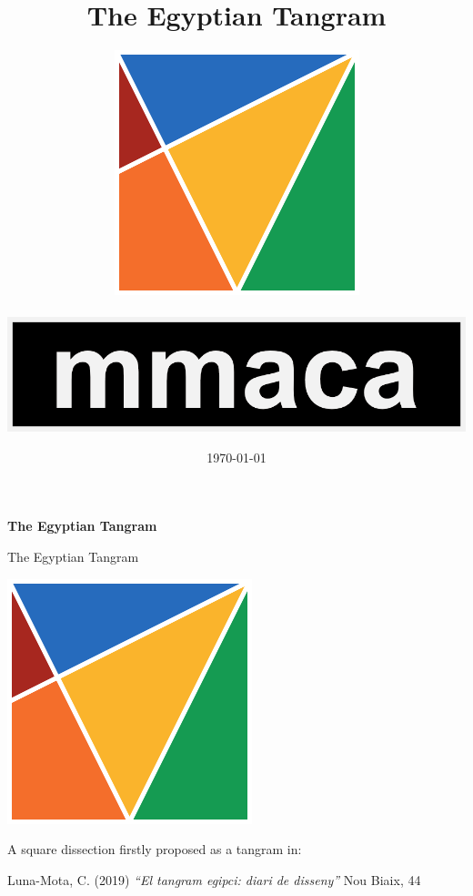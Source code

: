 \documentclass[14pt]{beamer}
\title{The Egyptian Tangram\vspace{-0.25em}}
\author{
    \includegraphics[height=18ex]{figures/figure001a.pdf}\\
    \;\;{\small \textcopyright\ \href{https://github.com/CarlosLunaMota}{Carlos Luna-Mota}}\\
    \vspace{0.75em}
    \href{https://mmaca.cat/}{\includegraphics[width=10ex]{figures/logo.png}}\\
    \vspace{-1.75em}}
\date{\today}
\begin{document}

    \begin{frame}
      \titlepage
    \end{frame}


    \begin{frame}{}
        \begin{center}
            \textbf{\huge The Egyptian Tangram}
        \end{center}
    \end{frame}


    \begin{frame}{The Egyptian Tangram}
        \begin{center}
            \includegraphics[height=20ex]{figures/figure001a.pdf} \\

            \bigskip

            A square dissection firstly proposed as a tangram in:

            \bigskip

            {\footnotesize Luna-Mota, C. (2019) \emph{``El tangram egipci: diari de disseny''} Nou Biaix, 44}
        \end{center}
    \end{frame}

\end{document}
